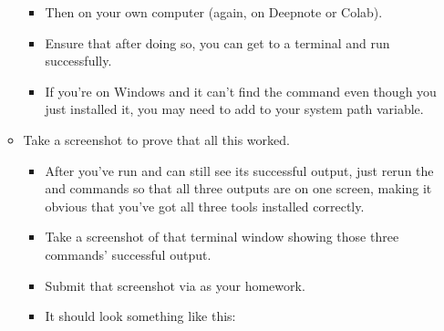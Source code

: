 \documentclass[letterpaper,10pt,english]{jupyterBook}
\begin{document}
\begin{itemize}
\begin{itemize}
\begin{itemize}
\item {} 
\sphinxAtStartPar
Then  on your own computer (again,  on Deepnote or Colab).

\item {} 
\sphinxAtStartPar
Ensure that after doing so, you can get to a terminal and run  successfully.

\item {} 
\sphinxAtStartPar
If you’re on Windows and it can’t find the  command even though you just installed it, you may need to add  to your system path variable.  

\end{itemize}

\item {} 
\sphinxAtStartPar
Take a screenshot to prove that all this worked.
\begin{itemize}
\item {} 
\sphinxAtStartPar
After you’ve run  and can still see its successful output, just re\sphinxhyphen{}run the  and  commands so that all three outputs are on one screen, making it obvious that you’ve got all three tools installed correctly.

\item {} 
\sphinxAtStartPar
Take a screenshot of that terminal window showing those three commands’ successful output.

\item {} 
\sphinxAtStartPar
Submit that screenshot via  as your homework.

\item {} 
\sphinxAtStartPar
It should look something like this:

\end{itemize}

\end{itemize}

\end{itemize}
\end{document}
